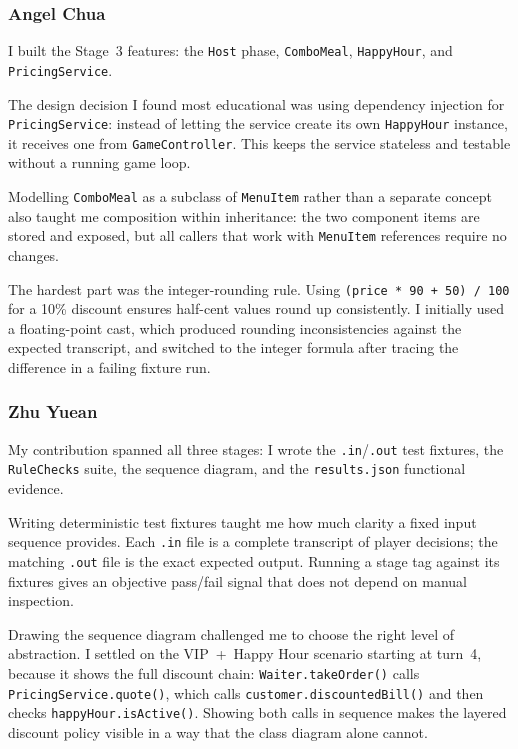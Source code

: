 \subsubsection*{Angel Chua}
I built the Stage~3 features: the \texttt{Host} phase, \texttt{ComboMeal},
\texttt{HappyHour}, and \texttt{PricingService}.

The design decision I found most educational was using dependency injection for
\texttt{PricingService}: instead of letting the service create its own
\texttt{HappyHour} instance, it receives one from \texttt{GameController}.
This keeps the service stateless and testable without a running game loop.

Modelling \texttt{ComboMeal} as a subclass of \texttt{MenuItem} rather than a
separate concept also taught me composition within inheritance: the two component
items are stored and exposed, but all callers that work with \texttt{MenuItem}
references require no changes.

The hardest part was the integer-rounding rule.
Using \texttt{(price * 90 + 50) / 100} for a 10\% discount ensures half-cent
values round up consistently.
I initially used a floating-point cast, which produced rounding inconsistencies
against the expected transcript, and switched to the integer formula after
tracing the difference in a failing fixture run.

\subsubsection*{Zhu Yuean}
My contribution spanned all three stages: I wrote the \texttt{.in}/\texttt{.out}
test fixtures, the \texttt{RuleChecks} suite, the sequence diagram, and the
\texttt{results.json} functional evidence.

Writing deterministic test fixtures taught me how much clarity a fixed input
sequence provides.
Each \texttt{.in} file is a complete transcript of player decisions; the matching
\texttt{.out} file is the exact expected output.
Running a stage tag against its fixtures gives an objective pass/fail signal that
does not depend on manual inspection.

Drawing the sequence diagram challenged me to choose the right level of
abstraction.
I settled on the VIP~+~Happy Hour scenario starting at turn~4, because it shows
the full discount chain: \texttt{Waiter.takeOrder()} calls
\texttt{PricingService.quote()}, which calls \texttt{customer.discountedBill()}
and then checks \texttt{happyHour.isActive()}.
Showing both calls in sequence makes the layered discount policy visible in a
way that the class diagram alone cannot.

